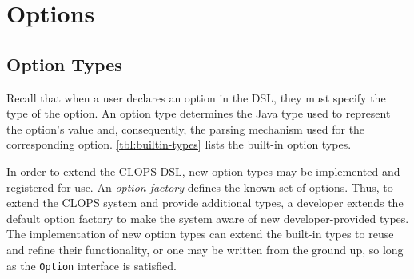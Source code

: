 \documentclass[a4paper]{article}
\def\lstinlinen{\lstinline[basicstyle=\normalsize\sffamily]}
\begin{document}
\section{Options}

\subsection{Option Types}
\label{subsec:option-types}

Recall that when a user declares an option in the DSL, they must
specify the type of the option. An option type determines the Java
type used to represent the option's value and, consequently, the
parsing mechanism used for the corresponding option.
\autoref{tbl:builtin-types} lists the built-in option
types. 

In order to extend the CLOPS DSL, new option types may be implemented and
registered for use. An \emph{option factory} defines the known set of options. Thus,
to extend the CLOPS system and provide additional types, a developer
extends the default option factory to make the system
aware of new developer-provided types. The implementation of new option types 
can extend the built-in types to reuse and refine their functionality, or one
may be written from the ground up, so long as the \lstinlinen|Option| interface
is satisfied.
\end{document}
